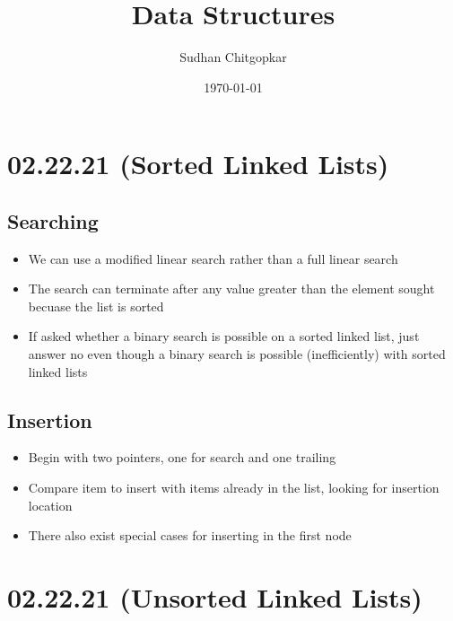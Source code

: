 \documentclass[11pt]{article}
\author{Sudhan Chitgopkar}
\date{\today}
\title{Data Structures}
\begin{document}
\maketitle
\section*{02.22.21 (Sorted Linked Lists)}
\label{sec:org813001a}
\subsection*{Searching}
\label{sec:orgccbda5a}
\begin{itemize}
\item We can use a modified linear search rather than a full linear search
\item The search can terminate after any value greater than the element sought becuase the list is sorted
\item If asked whether a binary search is possible on a sorted linked list, just answer no even though a binary search is possible (inefficiently) with sorted linked lists
\end{itemize}
\subsection*{Insertion}
\label{sec:org3d32ce8}
\begin{itemize}
\item Begin with two pointers, one for search and one trailing
\item Compare item to insert with items already in the list, looking for insertion location
\item There also exist special cases for inserting in the first node
\end{itemize}
\section*{02.22.21 (Unsorted Linked Lists)}
\label{sec:orgdd3802c}
\end{document}

